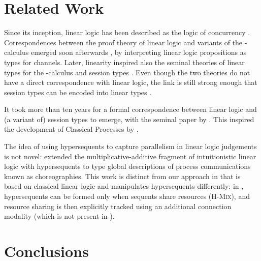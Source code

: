 \documentclass[draft,submission,copyright,creativecommons]{eptcs}
\begin{document}
\section{Related Work}
\label{sec:related-work}

Since its inception, linear logic has been described as the logic of concurrency \cite{girard1987}. Correspondences between the proof theory of linear logic and variants of the \textpi-calculus emerged soon afterwards \cite{abramsky1994,bellin1994}, by interpreting linear logic propositions as types for channels. Later, linearity inspired also the seminal theories of linear types for the \textpi-calculus \cite{kobayashi1999} and session types \cite{honda1998}. Even though the two theories do not have a direct correspondence with linear logic, the link is still strong enough that session types can be encoded into linear types \cite{dardha2017}.

It took more than ten years for a formal correspondence between linear logic and (a variant of) session types to emerge, with the seminal paper by \citet{caires2010}. This inspired the development of Classical Processes by \citet{wadler2012}.

The idea of using hypersequents to capture parallelism in linear logic judgements is not novel: \citet{carbone2018} extended the multiplicative-additive fragment of intuitionistic linear logic with hypersequents to type global descriptions of process communications known as choreographies. This work is distinct from our approach in that \hcp is based on classical linear logic and manipulates hypersequents differently: in \citet{carbone2018}, hypersequents can be formed only when sequents share resources (\cf \textsc{H-Mix}), and resource sharing is then explicitly tracked using an additional connection modality (which is not present in \hcp). 

\section{Conclusions}
\label{sec:conclusions}



\clearpage


\end{document}
